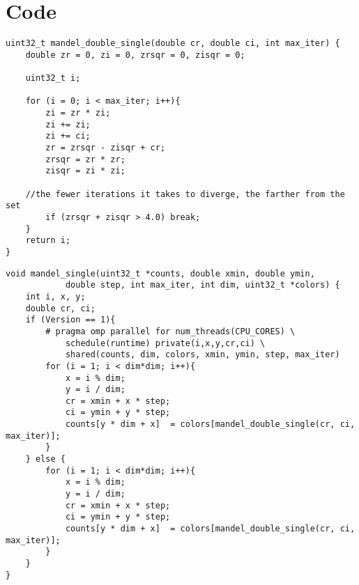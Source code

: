 \documentclass{article}
\begin{document}
\section{Code}
\lstset{language=C,stringstyle=\ttfamily, showstringspaces=false, numbers=left, frame=single, framexrightmargin=0pt, columns=fullflexible, breaklines=true, breakatwhitespace=true}

\begin{lstlisting}[caption={Serial Mandelbrot},label={appendix:serial}]
uint32_t mandel_double_single(double cr, double ci, int max_iter) {
    double zr = 0, zi = 0, zrsqr = 0, zisqr = 0;

    uint32_t i;

    for (i = 0; i < max_iter; i++){
		zi = zr * zi;
		zi += zi;
		zi += ci;
		zr = zrsqr - zisqr + cr;
		zrsqr = zr * zr;
		zisqr = zi * zi;
		
    //the fewer iterations it takes to diverge, the farther from the set
		if (zrsqr + zisqr > 4.0) break;
    }
    return i;
}
\end{lstlisting}

\begin{lstlisting}[caption={OpenMP Mandelbrot},label={appendix:omp}]
void mandel_single(uint32_t *counts, double xmin, double ymin,
            double step, int max_iter, int dim, uint32_t *colors) {
    int i, x, y;
    double cr, ci;
    if (Version == 1){
        # pragma omp parallel for num_threads(CPU_CORES) \
            schedule(runtime) private(i,x,y,cr,ci) \
            shared(counts, dim, colors, xmin, ymin, step, max_iter)
        for (i = 1; i < dim*dim; i++){
            x = i % dim;
            y = i / dim;
            cr = xmin + x * step;
            ci = ymin + y * step;
            counts[y * dim + x]  = colors[mandel_double_single(cr, ci, max_iter)];
        }
    } else {
        for (i = 1; i < dim*dim; i++){
            x = i % dim;
            y = i / dim;
            cr = xmin + x * step;
            ci = ymin + y * step;
            counts[y * dim + x]  = colors[mandel_double_single(cr, ci, max_iter)];
        }
    }
}
\end{lstlisting}



 

\end{document}
